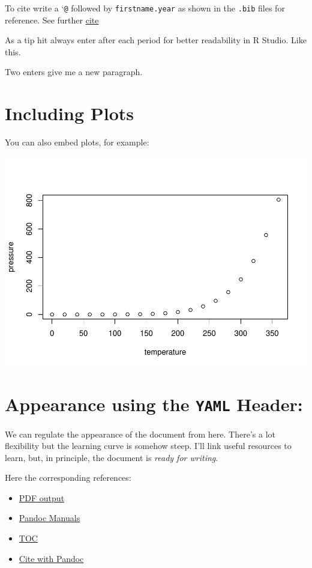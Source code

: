 \documentclass[
]{report}
\providecommand{\tightlist}{%
  \setlength{\itemsep}{0pt}\setlength{\parskip}{0pt}}
\begin{document}
To cite write a `\texttt{@} followed by \texttt{firstname.year} as shown
in the \texttt{.bib} files for reference. See further
\href{https://rmarkdown.rstudio.com/authoring_bibliographies_and_citations.html}{cite}

As a tip hit always enter after each period for better readability in R
Studio. Like this.

Two enters give me a new paragraph.

\hypertarget{including-plots}{%
\section{Including Plots}\label{including-plots}}

You can also embed plots, for example:

\includegraphics{1_REPORT_files/figure-latex/pressure-1.pdf}

\hypertarget{appearance-using-the-yaml-header}{%
\section{\texorpdfstring{Appearance using the \texttt{YAML}
Header:}{Appearance using the YAML Header:}}\label{appearance-using-the-yaml-header}}

We can regulate the appearance of the document from here. There's a lot
flexibility but the learning curve is somehow steep. I'll link useful
resources to learn, but, in principle, the document is \emph{ready for
writing}.

Here the corresponding references:

\begin{itemize}
\tightlist
\item
  \href{https://bookdown.org/yihui/rmarkdown/pdf-document.html}{PDF
  output}
\item
  \href{https://pandoc.org/MANUAL.html\#templates}{Pandoc Manuals}
\item
  \href{https://bookdown.org/yihui/rmarkdown/pdf-document.html\#table-of-contents-1}{TOC}
\item
  \href{https://github.com/jgm/pandoc-citeproc/blob/master/man/pandoc-citeproc.1.md}{Cite
  with Pandoc}
\end{itemize}
\end{document}
